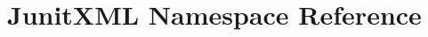 \hypertarget{namespaceJunitXML}{\section{Junit\-X\-M\-L Namespace Reference}
\label{namespaceJunitXML}
}
